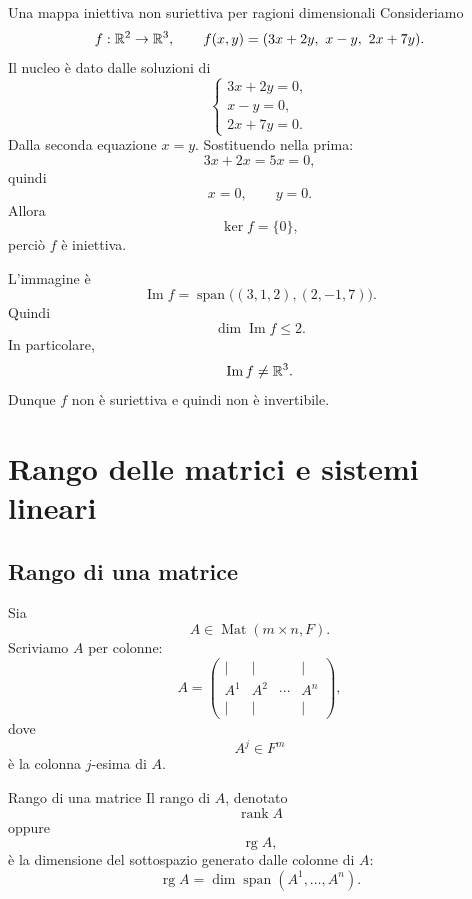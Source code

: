 \documentclass[a4paper]{article}
\begin{document}
\begin{snippetexample}{Una mappa iniettiva non suriettiva per ragioni dimensionali}
    Consideriamo
    \[
        f:\mathbb{R}^2\to\mathbb{R}^3,
        \qquad
        f(x,y)=(3x+2y,\ x-y,\ 2x+7y).
    \]
    Il nucleo è dato dalle soluzioni di
    \[
        \begin{cases}
            3x+2y=0,\\
            x-y=0,\\
            2x+7y=0.
        \end{cases}
    \]
    Dalla seconda equazione \(x=y\). Sostituendo nella prima:
    \[
        3x+2x=5x=0,
    \]
    quindi
    \[
        x=0,
        \qquad
        y=0.
    \]
    Allora
    \[
        \ker f=\{0\},
    \]
    perciò \(f\) è iniettiva.

    L'immagine è
    \[
        \operatorname{Im}f
        =
        \operatorname{span}\bigl((3,1,2),(2,-1,7)\bigr).
    \]
    Quindi
    \[
        \dim\operatorname{Im}f\leq 2.
    \]
    In particolare,
    \[
        \operatorname{Im}f\neq\mathbb{R}^3.
    \]
    Dunque \(f\) non è suriettiva e quindi non è invertibile.
\end{snippetexample}

\section{Rango delle matrici e sistemi lineari}

\subsection{Rango di una matrice}

Sia
\[
    A\in\operatorname{Mat}(m\times n,F).
\]
Scriviamo \(A\) per colonne:
\[
    A=
    \begin{pmatrix}
        \vert & \vert & & \vert\\
        A^1 & A^2 & \cdots & A^n\\
        \vert & \vert & & \vert
    \end{pmatrix},
\]
dove
\[
    A^j\in F^m
\]
è la colonna \(j\)-esima di \(A\).

\begin{snippetdefinition}{Rango di una matrice}
    Il rango di \(A\), denotato
    \[
        \operatorname{rank} A
    \]
    oppure
    \[
        \operatorname{rg} A,
    \]
    è la dimensione del sottospazio generato dalle colonne di \(A\):
    \[
        \operatorname{rg}A
        =
        \dim\operatorname{span}(A^1,\ldots,A^n).
    \]
\end{snippetdefinition}
\end{document}
